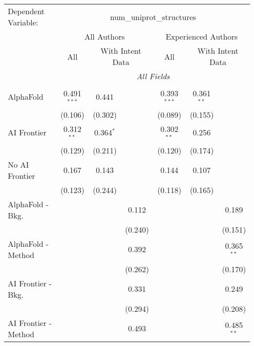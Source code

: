 \begingroup
\centering
\begin{tabular}{lcccccc}
   \tabularnewline \midrule \midrule
   Dependent Variable: & \multicolumn{6}{c}{num\_uniprot\_structures}\\
 & \multicolumn{3}{c}{All Authors} & \multicolumn{3}{c}{Experienced Authors} \\
\cmidrule(lr){2-4} \cmidrule(lr){5-7}
 & \multicolumn{1}{c}{All} & \multicolumn{2}{c}{With Intent Data} & \multicolumn{1}{c}{All} & \multicolumn{2}{c}{With Intent Data} \\
\cmidrule(lr){2-2} \cmidrule(lr){3-4} \cmidrule(lr){5-5} \cmidrule(lr){6-7}
 & \multicolumn{6}{c}{\textit{All Fields}} \\ \\
   AlphaFold               & 0.491$^{***}$ & 0.441       &         & 0.393$^{***}$ & 0.361$^{**}$ &   \\   
                           & (0.106)       & (0.302)     &         & (0.089)       & (0.155)      &   \\   
   AI Frontier             & 0.312$^{**}$  & 0.364$^{*}$ &         & 0.302$^{**}$  & 0.256        &   \\   
                           & (0.129)       & (0.211)     &         & (0.120)       & (0.174)      &   \\   
   No AI Frontier          & 0.167         & 0.143       &         & 0.144         & 0.107        &   \\   
                           & (0.123)       & (0.244)     &         & (0.118)       & (0.165)      &   \\   
   AlphaFold - Bkg.        &               &             & 0.112   &               &              & 0.189\\   
                           &               &             & (0.240) &               &              & (0.151)\\   
   AlphaFold - Method      &               &             & 0.392   &               &              & 0.365$^{**}$\\   
                           &               &             & (0.262) &               &              & (0.170)\\   
   AI Frontier - Bkg.      &               &             & 0.331   &               &              & 0.249\\   
                           &               &             & (0.294) &               &              & (0.208)\\   
   AI Frontier - Method    &               &             & 0.493   &               &              & 0.485$^{**}$\\   

\end{tabular}
